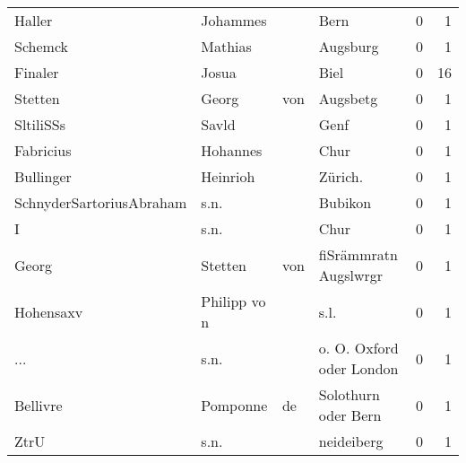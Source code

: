 \begin{center}
\begin{tiny}
\begin{longtabu}{llllrr}
                   Haller &                           Johammes &             &                                        Bern &          0 &         1 \\
                  Schemck &                            Mathias &             &                                    Augsburg &          0 &         1 \\
                  Finaler &                              Josua &             &                                        Biel &          0 &        16 \\
                  Stetten &                              Georg &         von &                                    Augsbetg &          0 &         1 \\
                SltiliSSs &                              Savld &             &                                        Genf &          0 &         1 \\
                Fabricius &                           Hohannes &             &                                        Chur &          0 &         1 \\
                Bullinger &                           Heinrioh &             &                                    Zürich.  &          0 &         1 \\
 SchnyderSartoriusAbraham &                               s.n. &             &                                     Bubikon &          0 &         1 \\
                        I &                               s.n. &             &                                        Chur &          0 &         1 \\
                    Georg &                            Stetten &         von &                       fiSrämmratn Augslwrgr &          0 &         1 \\
                Hohensaxv &                       Philipp vo n &             &                                        s.l. &          0 &         1 \\
                      ... &                               s.n. &             &                    o. O. Oxford oder London &          0 &         1 \\
                 Bellivre &                           Pomponne &          de &                         Solothurn oder Bern &          0 &         1 \\
                     ZtrU &                               s.n. &             &                                  neideiberg &          0 &         1 \\

\end{longtabu}
\end{tiny}
\end{center}
